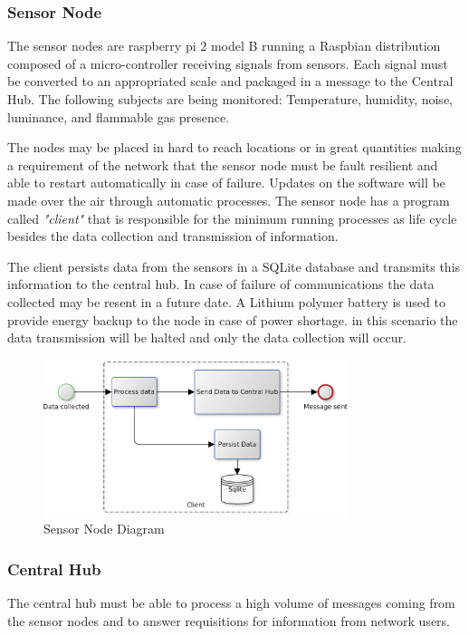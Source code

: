 \documentclass[conference]{IEEEtran}
\begin{document}
\subsubsection{Sensor Node}
The sensor nodes are raspberry pi 2 model B \cite{Raspberry2015} running a Raspbian\cite{Raspbian2015} distribution composed of a micro-controller receiving signals from sensors.
Each signal must be converted to an appropriated scale and packaged in a message to the Central Hub.
The following subjects are being monitored: Temperature, humidity, noise, luminance, and flammable gas presence.

The nodes may be placed in hard to reach locations or in great quantities making a requirement of the network that the sensor node must be fault resilient and able to restart automatically in case of failure.
Updates on the software will be made over the air through automatic processes.
The sensor node has a program called \textit{"client"} that is responsible for the minimum running processes as life cycle besides the data collection and transmission of information.

The client persists data from the sensors in a SQLite\cite{Sqlite2015} database and transmits this information to the central hub. In case of failure of communications the data collected may be resent in a future date.
A Lithium polymer battery is used to provide energy backup to the node in case of power shortage. in this scenario the data transmission will be halted and only the data collection will occur.
\begin{figure}[ht!]
\centering
\includegraphics[width=3.5in]{client_diagram}
\caption{Sensor Node Diagram}
\label{sensor_diagram}
\end{figure}


\subsubsection{Central Hub}
The central hub must be able to process a high volume of messages coming from the sensor nodes and to answer requisitions for information from network users.
\end{document}

